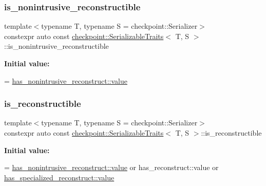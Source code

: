 \subsubsection{\texorpdfstring{is\+\_\+nonintrusive\+\_\+reconstructible}{is\_nonintrusive\_reconstructible}}
{\footnotesize\ttfamily template$<$typename T, typename S = checkpoint\+::\+Serializer$>$ \\
constexpr auto const \hyperlink{structcheckpoint_1_1_serializable_traits}{checkpoint\+::\+Serializable\+Traits}$<$ T, S $>$\+::is\+\_\+nonintrusive\+\_\+reconstructible\hspace{0.3cm}{\ttfamily [static]}}

{\bfseries Initial value\+:}
\begin{DoxyCode}
=
    \hyperlink{structdetection_1_1detector_a6d7d0e1bdf5903db9edbe448edccf83b}{has\_nonintrusive\_reconstruct::value}
\end{DoxyCode}
\mbox{\label{structcheckpoint_1_1_serializable_traits_a6cc78a7cc9b4645727c92437619fce83}} 
\subsubsection{\texorpdfstring{is\+\_\+reconstructible}{is\_reconstructible}}
{\footnotesize\ttfamily template$<$typename T, typename S = checkpoint\+::\+Serializer$>$ \\
constexpr auto const \hyperlink{structcheckpoint_1_1_serializable_traits}{checkpoint\+::\+Serializable\+Traits}$<$ T, S $>$\+::is\+\_\+reconstructible\hspace{0.3cm}{\ttfamily [static]}}

{\bfseries Initial value\+:}
\begin{DoxyCode}
=
    \hyperlink{structdetection_1_1detector_a6d7d0e1bdf5903db9edbe448edccf83b}{has\_nonintrusive\_reconstruct::value} or
    has\_reconstruct::value or
    \hyperlink{structdetection_1_1detector_a6d7d0e1bdf5903db9edbe448edccf83b}{has\_specialized\_reconstruct::value}
\end{DoxyCode}
\mbox{\label{structcheckpoint_1_1_serializable_traits_a3941c4fcb5397fe564a3453857aa9183}} 
